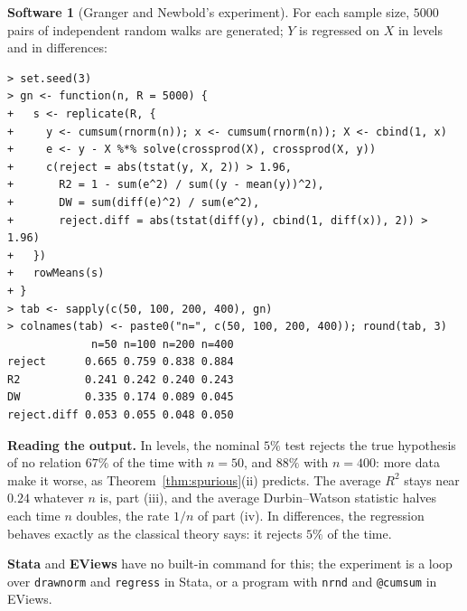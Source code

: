 \documentclass[11pt,a4paper]{article}
\numberwithin{equation}{section}
\theoremstyle{definition}
\newtheorem{software}[thm]{Software}
\begin{document}
\begin{software}[Granger and Newbold's experiment]
\label{sw:spurious}
For each sample size, $5000$ pairs of independent random walks are generated; $Y$ is regressed on $X$ in levels and in differences:
{\small\begin{verbatim}
> set.seed(3)
> gn <- function(n, R = 5000) {
+   s <- replicate(R, {
+     y <- cumsum(rnorm(n)); x <- cumsum(rnorm(n)); X <- cbind(1, x)
+     e <- y - X %*% solve(crossprod(X), crossprod(X, y))
+     c(reject = abs(tstat(y, X, 2)) > 1.96,
+       R2 = 1 - sum(e^2) / sum((y - mean(y))^2),
+       DW = sum(diff(e)^2) / sum(e^2),
+       reject.diff = abs(tstat(diff(y), cbind(1, diff(x)), 2)) > 1.96)
+   })
+   rowMeans(s)
+ }
> tab <- sapply(c(50, 100, 200, 400), gn)
> colnames(tab) <- paste0("n=", c(50, 100, 200, 400)); round(tab, 3)
             n=50 n=100 n=200 n=400
reject      0.665 0.759 0.838 0.884
R2          0.241 0.242 0.240 0.243
DW          0.335 0.174 0.089 0.045
reject.diff 0.053 0.055 0.048 0.050
\end{verbatim}}
\textbf{Reading the output.} In levels, the nominal $5\%$ test rejects the true hypothesis of no relation $67\%$ of the time with $n = 50$, and $88\%$ with $n = 400$:
more data make it worse, as Theorem~\ref{thm:spurious}(ii) predicts. The average $R^2$ stays near $0.24$ whatever $n$ is, part (iii), and the average Durbin--Watson
statistic halves each time $n$ doubles, the rate $1/n$ of part (iv). In differences, the regression behaves exactly as the classical theory says: it
rejects $5\%$ of the time.

\textbf{Stata} and \textbf{EViews} have no built-in command for this; the experiment is a loop over \texttt{drawnorm} and \texttt{regress} in Stata, or a
program with \texttt{nrnd} and \texttt{@cumsum} in EViews.
\end{software}
\end{document}

